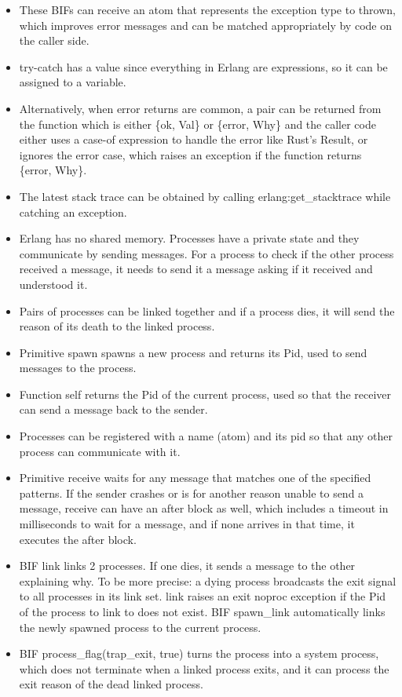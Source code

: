 \documentclass[a4paper,11pt]{article}
\theoremstyle{plain}
\theoremstyle{nonumberplain}
\begin{document}
\begin{itemize}
  \item These BIFs can receive an atom that represents the exception type to thrown, which improves error messages and can be matched appropriately by code on the caller side.
  \item try-catch has a value since everything in Erlang are expressions, so it can be assigned to a variable.
  \item Alternatively, when error returns are common, a pair can be returned from the function which is either \{ok, Val\} or \{error, Why\} and the caller code either uses a case-of expression to handle the error like Rust's Result, or ignores the error case, which raises an exception if the function returns \{error, Why\}.
  \item The latest stack trace can be obtained by calling erlang:get\_stacktrace while catching an exception.
  \item Erlang has no shared memory. Processes have a private state and they communicate by sending messages. For a process to check if the other process received a message, it needs to send it a message asking if it received and understood it.
  \item Pairs of processes can be linked together and if a process dies, it will send the reason of its death to the linked process.
  \item Primitive spawn spawns a new process and returns its Pid, used to send messages to the process.
  \item Function self returns the Pid of the current process, used so that the receiver can send a message back to the sender.
  \item Processes can be registered with a name (atom) and its pid so that any other process can communicate with it.
  \item Primitive receive waits for any message that matches one of the specified patterns. If the sender crashes or is for another reason unable to send a message, receive can have an after block as well, which includes a timeout in milliseconds to wait for a message, and if none arrives in that time, it executes the after block.
  \item BIF link links 2 processes. If one dies, it sends a message to the other explaining why. To be more precise: a dying process broadcasts the exit signal to all processes in its link set. link raises an exit noproc exception if the Pid of the process to link to does not exist. BIF spawn\_link automatically links the newly spawned process to the current process.
  \item BIF process\_flag(trap\_exit, true) turns the process into a system process, which does not terminate when a linked process exits, and it can process the exit reason of the dead linked process.

\end{itemize}
\end{document}
